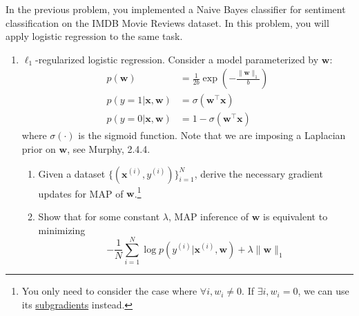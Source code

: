 \begin{problem}

  In the previous problem, you implemented a Naive Bayes classifier
  for sentiment classification on the IMDB Movie Reviews dataset.  In this
  problem, you will apply logistic regression to the same task.

\begin{enumerate}[label=(\alph*)]

    \item $\ell_1$-regularized logistic regression. Consider a model parameterized by $\mathbf{w}$:
    \begin{align*}
        p(\mathbf{w}) & = \frac{1}{2b}\exp(-\frac{\|\mathbf{w}\|_1}{b}) \\
    p(y = 1 | \mathbf{x}, \mathbf{w}) & = \sigma(\mathbf{w}^\top \mathbf{x})\\
    p(y = 0 | \mathbf{x}, \mathbf{w}) & = 1 - \sigma (\mathbf{w}^\top \mathbf{x})
    \end{align*}
    where $\sigma(\cdot)$ is the
    sigmoid
      function. Note that we are imposing a Laplacian prior on
    $\mathbf{w}$, see Murphy, 2.4.4.

        \begin{enumerate}[label=(\roman*)]
             \item Given a dataset $\{(\mathbf{x}^{(i)},y^{(i)})\}_{i=1}^N$, derive the necessary gradient updates for MAP of $\mathbf{w}$.\footnote{You only need to consider the case where $\forall i, w_i\neq 0$. If $\exists i, w_i=0$, we can use its \href{https://see.stanford.edu/materials/lsocoee364b/01-subgradients_notes.pdf}{subgradients} instead.}
             \item Show that for some constant $\lambda$, MAP inference of $\mathbf{w}$ is equivalent to minimizing
                 \begin{equation*}
                     - \frac{1}{N} \sum_{i=1}^N \log p(y^{(i)}|\mathbf{x}^{(i)},
                     \mathbf{w}) + \lambda \|\mathbf{w}\|_1
                 \end{equation*}
         \end{enumerate}


\end{enumerate}
\end{problem}
